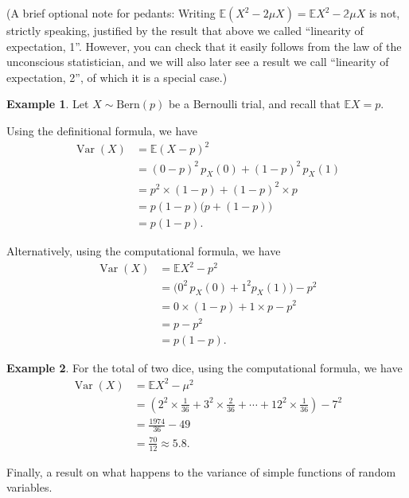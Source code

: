 \documentclass[
  a4paper,
]{book}
\theoremstyle{definition}
\theoremstyle{definition}
\newtheorem{example}{Example}[chapter]
\theoremstyle{definition}
\theoremstyle{definition}
\theoremstyle{remark}
\begin{document}
(A brief optional note for pedants: Writing \(\mathbb E(X^2 - 2\mu X) = \mathbb EX^2 - \mathbb 2\mu X\) is not, strictly speaking, justified by the result that above we called ``linearity of expectation, 1''. However, you can check that it easily follows from the law of the unconscious statistician, and we will also later see a result we call ``linearity of expectation, 2'', of which it is a special case.)

\begin{example}
Let \(X \sim \text{Bern}(p)\) be a Bernoulli trial, and recall that \(\mathbb EX = p\).

Using the definitional formula, we have
\begin{align*}
\operatorname{Var}(X) &= \mathbb E(X-p)^2 \\
        &= (0 - p)^2 \,p_X(0) + (1-p)^2\, p_X(1) \\
        &= p^2\times(1-p) + (1-p)^2 \times p \\
        &= p(1-p)\big(p + (1-p)\big) \\
        &= p(1-p) .
\end{align*}

Alternatively, using the computational formula, we have
\begin{align*}
\operatorname{Var}(X) &= \mathbb EX^2 - p^2 \\
        &= \big(0^2\,p_X(0) + 1^2 p_X(1)\big) - p^2 \\
        &= 0\times(1-p) + 1\times p - p^2 \\
        &= p - p^2 \\
        &= p(1-p) .
\end{align*}
\end{example}

\begin{example}
For the total of two dice, using the computational formula, we have
\begin{align*}
\operatorname{Var}(X) &= \mathbb EX^2 - \mu^2 \\
        &= \left(2^2 \times \frac{1}{36} + 3^2 \times \frac{2}{36} + \cdots + 12^2 \times \frac{1}{36}\right) - 7^2 \\
        &= \frac{1974}{36} - 49 \\
        &= \frac{70}{12} \approx 5.8 .
\end{align*}
\end{example}

Finally, a result on what happens to the variance of simple functions of random variables.
\end{document}
